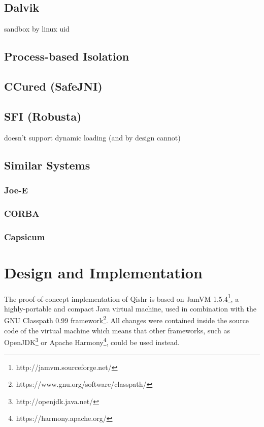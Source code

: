 \documentclass[a4paper,12pt,twoside,openright]{report}
\begin{document}
\section{Dalvik}

sandbox by linux uid

\section{Process-based Isolation}

\section{CCured (SafeJNI)}

\section{SFI (Robusta)}

doesn't support dynamic loading (and by design cannot)

\section{Similar Systems}

\subsection{Joe-E}
\subsection{CORBA}
\subsection{Capsicum}


\chapter{Design and Implementation} 

The proof-of-concept implementation of Qishr is based on JamVM 1.5.4\footnote{http://jamvm.sourceforge.net/}, a highly-portable and compact Java virtual machine, used in combination with the GNU Classpath 0.99 framework\footnote{https://www.gnu.org/software/classpath/}. All changes were contained inside the source code of the virtual machine which means that other frameworks, such as OpenJDK\footnote{http://openjdk.java.net/} or Apache Harmony\footnote{https://harmony.apache.org/}, could be used instead.
\end{document}
